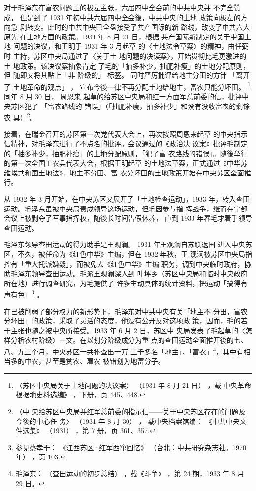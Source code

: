 对于毛泽东在富农问题上的极左主张，六届四中全会前的中共中央并 不完全赞成，
但是到了 1931 年初中共六届四中全会後，中共中央的土地 政策向极左的方向急
剧转变。此时的中共中央已全盘接受了共产国际的新 路线，改变了中共六大原先
在土地方面的政策。1931 年 8 月 21 日，根据 共产国际新制定的关于中国土地
问题的决议，和王明于 1931 年 3 月起草 的〈土地法令草案〉的精神，由任弼时
主持，苏区中央局通过了〈关于土 地问题的决读案〉，开始贯彻比毛更激进的土
地政策。该决议案抽象肯定 了毛的「抽多补少，抽肥补瘦」的土地分配原则，但
随即又将其贴上「非 阶级的」 标签。 同时严厉批评给地主分田的方针 「离开了
土地革命的观点」 ， 宣布今後一律不再分配土地给地主，富农只能分坏田。
\footnote{〈苏区中央局关于士地问题的决议案〉 （1931 年 8 月 21 日） ，载
中央革命根据地史料选编》 ，下册，页 445、448.} 同年 8 月 30 日， 周恩来
起草的给苏区中央局和红一方面军总前委的信，批评中央苏区犯了 「富农路线的
错误」（「抽肥补瘦，抽多补少」和没有没收富农的剩馀农 具）\footnote{ 〈中
央给苏区中央局并红军总前委的指示信——关于中央苏区存在的问题及今後的中心任
务〉 （1931 年 8 月 30） ， 载中央档案馆编： 《中共中央文件选集》 （1931）
，第 7 册，页 361、357.}。

接着，在瑞金召开的苏区第一次党代表大会上，再次按照周恩来起草
的中央指示信精神，对毛泽东进行了不点名的批评。会议通过的《政治决
议案》批评毛制定的「抽多补少，抽肥补瘦」的土地分配原则，「犯了富
农路线的错误」。随後举行的第一次全国工农兵代表大会，根据王明起草
的土地法草案，正式通过《中华苏维埃共和国土地法》，地主不分田、富
农分坏田的土地政策开始在中央苏区全面推行。
 
从 1932 年 3 月开始，在中央苏区又展开了「土地检查运动」，1933
年，转入查田运动。毛泽东虽被中央局责成领导这场运动，但毛因参与指
挥战争，继而在宁都会议上被剥夺了军事指挥权，随後长时间告假休养，
直到 1933 年春毛才着手领导查田运动。
 
毛泽东领导查田运动的得力助手是王观澜。
1931 年王观澜自苏联返国
进入中央苏区，不久，被任命为《红色中华》主编，但在 1932 年秋，王
观澜被苏区中央局指控有「重大托派嫌疑」，而被免去《红色中华》主编
职务，调到中央临时政府，协助毛泽东领导查田运动。毛派王观澜深人到
叶坪乡（苏区中央局和临时中央政府所在地）进行调查研究，为毛提供了
许多生动具体的统计资料，把运动「搞得有声有色」\footnote{参见蔡孝干：
《江西苏区·红军西窜回忆》
（台北：中共研究杂志社。1970 年）
，页 103. } 。
 
在已被削弱了部分权力的新形势下，毛泽东对中共中央有关「地主不
分田，富农分坏田」的政策，采取了灵活的态度，他没有公开反对这项政
策，因而，毛的若干主张也随之被中央所接受。1933 年 6 月 2 日，苏区中
央局发表了毛起草的〈怎样分析农村阶级〉一文。在以划分阶级成分为重
点的查田运动全面推开後的七、八、九三个月，中央苏区一共补查出一万
三千多名「地主」、「富农」\footnote{毛泽东：
〈查田运动的初步总结〉
，载《斗争》
，第 24 期，1933 年 8 月 29 日。}，其中有相当多的中农，甚至是贫农、雇农
被错划为地富分子。


